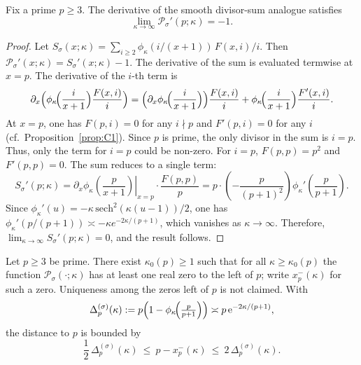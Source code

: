 \begin{lemma}\label{lem:Psigma-derivative-at-p}
Fix a prime $p\ge 3$. The derivative of the smooth divisor-sum analogue satisfies
\[
\lim_{\kappa\to\infty} \mathcal{P}_\sigma'(p;\kappa) = -1.
\]
\end{lemma}
\begin{proof}
Let $S_\sigma(x;\kappa) = \sum_{i\ge 2}\phi_\kappa(i/(x+1))\,F(x,i)/i$. Then $\mathcal{P}_\sigma'(x;\kappa) = S_\sigma'(x;\kappa)-1$. The derivative of the sum is evaluated termwise at $x=p$. The derivative of the $i$-th term is
\[
\partial_x\Bigl(\phi_\kappa\!\Bigl(\frac{i}{x+1}\Bigr)\frac{F(x,i)}{i}\Bigr) =
\Bigl(\partial_x\phi_\kappa\!\Bigl(\frac{i}{x+1}\Bigr)\Bigr)\frac{F(x,i)}{i} + \phi_\kappa\!\Bigl(\frac{i}{x+1}\Bigr)\frac{F'(x,i)}{i}.
\]
At $x=p$, one has $F(p,i)=0$ for any $i\nmid p$ and $F'(p,i)=0$ for any $i$ (cf.\ Proposition~\ref{prop:C1}). Since $p$ is prime, the only divisor in the sum is $i=p$. Thus, only the term for $i=p$ could be non-zero. For $i=p$, $F(p,p)=p^2$ and $F'(p,p)=0$. The sum reduces to a single term:
\[
S_\sigma'(p;\kappa) = \left. \partial_x\phi_\kappa\!\left(\frac{p}{x+1}\right)\right|_{x=p} \cdot \frac{F(p,p)}{p}
= p \cdot \left(-\frac{p}{(p+1)^2}\right) \phi_\kappa'\!\left(\frac{p}{p+1}\right).
\]
Since $\phi_\kappa'(u) = -\kappa\,\mathrm{sech}^2(\kappa(u-1))/2$, one has $\phi_\kappa'(p/(p+1)) \asymp -\kappa e^{-2\kappa/(p+1)}$, which vanishes as $\kappa\to\infty$. Therefore, $\lim_{\kappa\to\infty} S_\sigma'(p;\kappa) = 0$, and the result follows.
\end{proof}


\begin{lemma}\label{lem:Psigma-left-zero}
Let $p\ge3$ be prime. There exist $\kappa_0(p)\ge1$ such that for all $\kappa\ge\kappa_0(p)$ the function $\mathcal P_\sigma(\cdot;\kappa)$ has at least one real zero to the left of $p$; write $x_p^-(\kappa)$ for such a zero. Uniqueness among the zeros left of $p$ is not claimed. With
\[
\Delta_p^{(\sigma)}(\kappa):=p\Bigl(1-\phi_\kappa\!\Bigl(\tfrac{p}{p+1}\Bigr)\Bigr)\asymp p\,\mathrm e^{-2\kappa/(p+1)},
\]
the distance to $p$ is bounded by
\[
\frac{1}{2}\,\Delta_p^{(\sigma)}(\kappa)\ \le\ p-x_p^-(\kappa)\ \le\ 2\,\Delta_p^{(\sigma)}(\kappa).
\]
\end{lemma}


